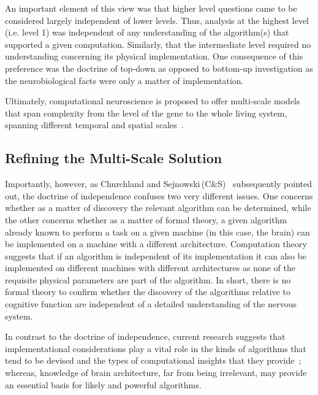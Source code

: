 \documentclass{article}
\begin{document}
An important element of this view was that higher level questions came to be considered largely independent of lower levels. Thus, analysis at the highest level (i.e. level 1) was independent of any understanding of the algorithm(s) that supported a given computation. Similarly, that the intermediate level required no understanding concerning its physical implementation. One consequence of this preference was the doctrine of top-down as opposed to bottom-up investigation as the neurobiological facts were only a matter of implementation.

Ultimately, computational neuroscience is proposed to offer multi-scale models that span complexity from the level of the gene to the whole living system, spanning different temporal and spatial scales~\cite{jung22}.

\subsection{Refining the Multi-Scale Solution}

Importantly, however, as Churchland and Sejnowski\,(C\&S)~\cite{Churchland:1992uq} subsequently pointed out, the doctrine of independence confuses two very different issues. One concerns whether as a matter of discovery the relevant algorithm can be determined, while the other concerns whether as a matter of formal theory, a given algorithm already known to perform a task on a given machine (in this case, the brain) can be implemented on a machine with a different architecture. Computation theory suggests that if an algorithm is independent of its implementation it can also be implemented on different machines with different architectures as none of the requisite physical parameters are part of the algorithm. In short, there is no formal theory to confirm whether the discovery of the algorithms relative to cognitive function are independent of a detailed understanding of the nervous system.

In contrast to the doctrine of independence, current research suggests that implementational considerations play a vital role in the kinds of algorithms that tend to be devised and the types of computational insights that they provide~\cite{Churchland:1992uq}; whereas, knowledge of brain architecture, far from being irrelevant, may provide an essential basis for likely and powerful algorithms. 
\end{document}
